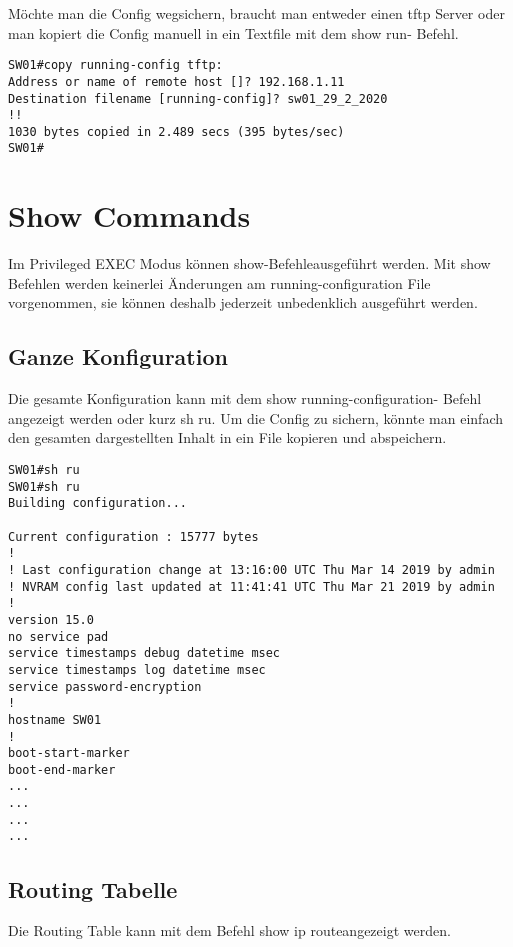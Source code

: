 Möchte man die Config wegsichern, braucht man entweder einen tftp Server oder man kopiert die Config manuell in ein Textfile mit dem \glqq show run\grqq - Befehl.

\begin{lstlisting}[language=CISCO] 
SW01#copy running-config tftp:
Address or name of remote host []? 192.168.1.11
Destination filename [running-config]? sw01_29_2_2020
!!
1030 bytes copied in 2.489 secs (395 bytes/sec)
SW01#
\end{lstlisting}

\section{Show Commands}
Im Privileged EXEC Modus können \glqq show-Befehle\grqq ausgeführt werden. Mit show Befehlen werden keinerlei Änderungen am running-configuration File vorgenommen, sie können deshalb jederzeit unbedenklich ausgeführt werden.

\subsection{Ganze Konfiguration}
Die gesamte Konfiguration kann mit dem \glqq show running-configuration\grqq - Befehl angezeigt werden oder kurz \glqq sh ru\grqq . Um die Config zu sichern, könnte man einfach den gesamten dargestellten Inhalt in ein File kopieren und abspeichern.
\begin{lstlisting}[language=CISCO] 
SW01#sh ru
SW01#sh ru
Building configuration...

Current configuration : 15777 bytes
!
! Last configuration change at 13:16:00 UTC Thu Mar 14 2019 by admin
! NVRAM config last updated at 11:41:41 UTC Thu Mar 21 2019 by admin
!
version 15.0
no service pad
service timestamps debug datetime msec
service timestamps log datetime msec
service password-encryption
!
hostname SW01
!
boot-start-marker
boot-end-marker
...
...
...
...
\end{lstlisting}

\subsection{Routing Tabelle}
Die Routing Table kann mit dem Befehl \glqq show ip route\grqq angezeigt werden. 







